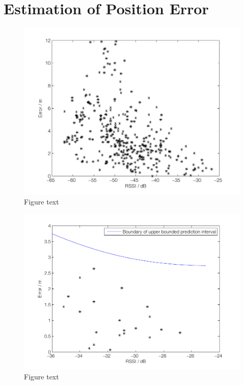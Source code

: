 \documentclass{LTHthesis}
\begin{document}
\section{Estimation of Position Error} %
%
\begin{figure}[!hbt]

\includegraphics[width=1\textwidth ]{images/adapt_parameters/error_vs_maxP_all}
\caption{Figure text}\label{error_vs_maxp_all}
\end{figure}
%
\begin{figure}[!hbt]

\includegraphics[width=1\textwidth ]{images/adapt_parameters/prediction_interval}
\caption{Figure text}\label{prediction_interval}
\end{figure}
\end{document}
